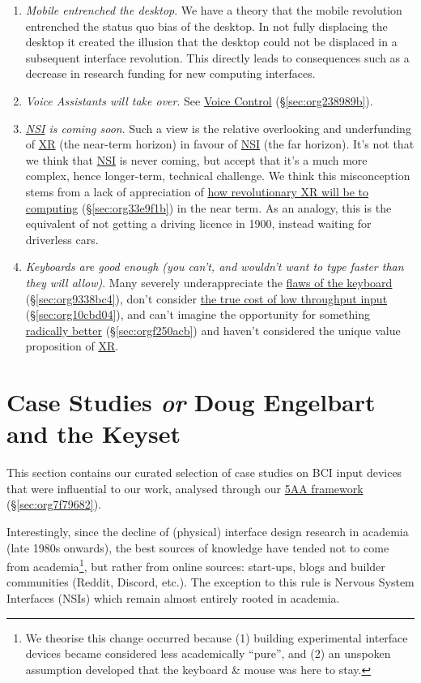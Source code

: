 \documentclass[logo,bsc,singlespacing,parskip]{infthesis}
\begin{document}
\begin{enumerate}
\item \emph{Mobile entrenched the desktop}.
We have a theory that the mobile revolution entrenched the status quo bias of the desktop.
In not fully displacing the desktop it created the illusion that the desktop could not be displaced in a subsequent interface revolution.
This directly leads to consequences such as a decrease in research funding for new computing interfaces.

\item \emph{Voice Assistants will take over}.
See \hyperref[sec:org238989b]{Voice Control} (\S \ref{sec:org238989b}).

\item \emph{\hyperref[orgf403bf3]{NSI} is coming soon}.
Such a view is the relative overlooking and underfunding of \hyperref[org39cbd51]{XR} (the near-term horizon) in favour of \hyperref[orgf403bf3]{NSI} (the far horizon).
It's not that we think that \hyperref[orgf403bf3]{NSI} is never coming, but accept that it's a much more complex, hence longer-term, technical challenge.
We think this misconception stems from a lack of appreciation of \hyperref[sec:org33e9f1b]{how revolutionary XR will be to computing} (\S \ref{sec:org33e9f1b}) in the near term.
As an analogy, this is the equivalent of not getting a driving licence in 1900, instead waiting for driverless cars.

\item \emph{Keyboards are good enough (you can't, and wouldn't want to type faster than they will allow)}.
Many severely underappreciate the \hyperref[sec:org9338bc4]{flaws of the keyboard} (\S \ref{sec:org9338bc4}), don't consider \hyperref[sec:org10cbd04]{the true cost of low throughput input} (\S \ref{sec:org10cbd04}), and can't imagine the opportunity for something \hyperref[sec:orgf250acb]{radically better} (\S \ref{sec:orgf250acb}) and haven't considered the unique value proposition of \hyperref[org39cbd51]{XR}.
\end{enumerate}

\part{Case Studies \emph{or} Doug Engelbart and the Keyset}
\label{sec:orgb1f4c1e}
This section contains our curated selection of case studies on BCI input devices that were influential to our work, analysed through our \hyperref[sec:org7f79682]{5AA framework} (\S \ref{sec:org7f79682}).

Interestingly, since the decline of (physical) interface design research in academia (late 1980s onwards), the best sources of knowledge have tended not to come from academia\footnote{We theorise this change occurred because (1) building experimental interface devices became considered less academically ``pure'', and (2) an unspoken assumption developed that the keyboard \& mouse was here to stay.}, but rather from online sources: start-ups, blogs and builder communities (Reddit, Discord, etc.).
The exception to this rule is Nervous System Interfaces (NSIs) which remain almost entirely rooted in academia.
\end{document}
